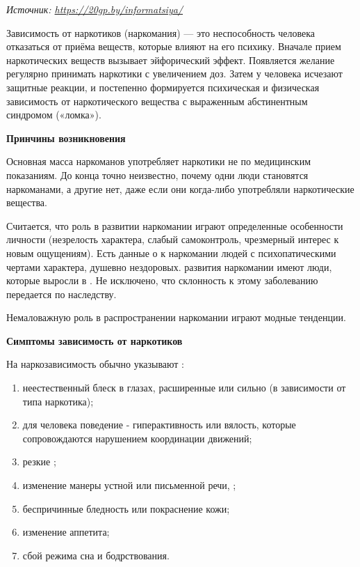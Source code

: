  {\it Источник: \url{https://20gp.by/informatsiya/}}

Зависимость от наркотиков (наркомания) --- это неспособность человека отказаться от приёма веществ, которые влияют на его психику. Вначале прием наркотических веществ вызывает эйфорический эффект. Появляется желание регулярно принимать наркотики с увеличением доз. Затем у человека исчезают защитные реакции, и постепенно формируется психическая и физическая зависимость от наркотического вещества с выраженным абстинентным синдромом («ломка»).

\textbf{Принчины возникновения}

Основная масса наркоманов употребляет наркотики не по медицинским показаниям. До конца точно неизвестно, почему одни люди становятся наркоманами, а другие нет, даже если они когда-либо употребляли наркотические вещества.

Считается, что роль в развитии наркомании играют определенные особенности личности (незрелость характера, слабый самоконтроль, чрезмерный интерес к новым ощущениям). Есть данные о  к наркомании людей с психопатическими чертами характера, душевно нездоровых.  развития наркомании имеют люди, которые выросли в . Не исключено, что склонность к этому заболеванию передается по наследству.

Немаловажную роль в распространении наркомании играют модные тенденции.

\textbf{Симптомы зависимость от наркотиков}

На наркозависимость обычно указывают :
\begin{enumerate}
    \item неестественный блеск в глазах, расширенные или сильно  (в зависимости от типа наркотика);
    \item {} для человека поведение  - гиперактивность или вялость, которые сопровождаются нарушением координации движений;
    \item резкие ;
    \item изменение манеры устной или письменной речи, ;
    \item беспричинные бледность или покраснение кожи;
    \item изменение аппетита;
    \item сбой режима сна и бодрствования.
\end{enumerate}

